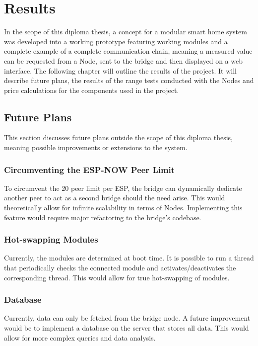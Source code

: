 \renewcommand*\chapterpagestyle{scrheadings}
\chapter{Results} 
In the scope of this diploma thesis, a concept for a modular smart home system
was developed into a working prototype featuring working modules and a complete
example of a complete communication chain, meaning a measured value can be 
requested from a Node, sent to the bridge and then displayed on a web interface.
The following chapter will outline the results of the project. It will
describe future plans, the results of the range tests conducted with the Nodes
and price calculations for the components used in the project.

\section{Future Plans}
This section discusses future plans outside the scope of this diploma thesis,
meaning possible improvements or extensions to the system.

    \subsection{Circumventing the ESP-NOW Peer Limit}
    To circumvent the 20 peer limit per ESP, the bridge can dynamically
    dedicate another peer to act as a second bridge should the
    need arise. This would theoretically allow for infinite scalability in terms
    of Nodes. Implementing this feature would require major refactoring to the
    bridge's codebase.

    \subsection{Hot-swapping Modules}
    Currently, the modules are determined at boot time. It is possible to run
    a thread that periodically checks the connected module and activates/deactivates 
    the corresponding thread. This would allow for true hot-swapping of modules.

    \subsection{Database}
    Currently, data can only be fetched from the bridge node.
    A future improvement would be to implement a database on the
    server that stores all data. This would allow for more 
    complex queries and data analysis.

